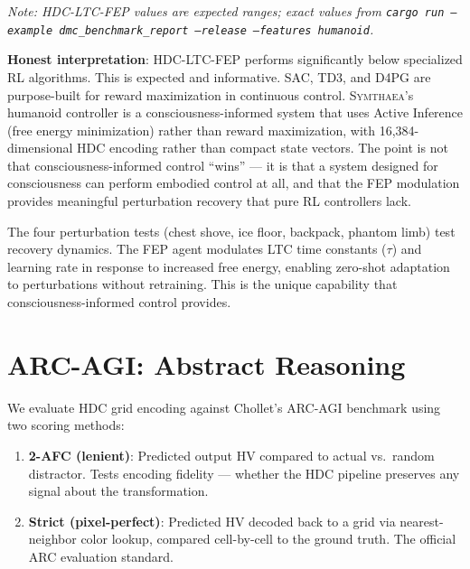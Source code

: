 \documentclass[12pt]{book}
\newcommand{\symthaea}{\textsc{Symthaea}}
\begin{document}
\textit{Note: HDC-LTC-FEP values are expected ranges; exact values from \texttt{cargo run --example dmc\_benchmark\_report --release --features humanoid}.}

\textbf{Honest interpretation}: HDC-LTC-FEP performs significantly below specialized RL algorithms. This is expected and informative. SAC, TD3, and D4PG are purpose-built for reward maximization in continuous control. \symthaea{}'s humanoid controller is a consciousness-informed system that uses Active Inference (free energy minimization) rather than reward maximization, with 16,384-dimensional HDC encoding rather than compact state vectors. The point is not that consciousness-informed control ``wins'' --- it is that a system designed for consciousness can perform embodied control at all, and that the FEP modulation provides meaningful perturbation recovery that pure RL controllers lack.

The four perturbation tests (chest shove, ice floor, backpack, phantom limb) test recovery dynamics. The FEP agent modulates LTC time constants ($\tau$) and learning rate in response to increased free energy, enabling zero-shot adaptation to perturbations without retraining. This is the unique capability that consciousness-informed control provides.

\section{ARC-AGI: Abstract Reasoning}
\label{sec:arc-agi}

We evaluate HDC grid encoding against Chollet's ARC-AGI benchmark using two scoring methods:

\begin{enumerate}
  \item \textbf{2-AFC (lenient)}: Predicted output HV compared to actual vs.\ random distractor. Tests encoding fidelity --- whether the HDC pipeline preserves any signal about the transformation.
  \item \textbf{Strict (pixel-perfect)}: Predicted HV decoded back to a grid via nearest-neighbor color lookup, compared cell-by-cell to the ground truth. The official ARC evaluation standard.
\end{enumerate}
\end{document}
